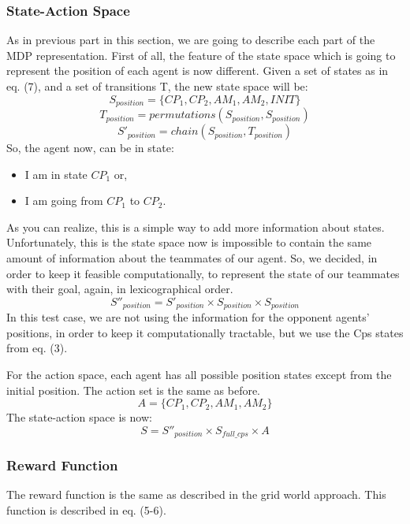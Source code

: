 \documentclass[conference]{IEEEtran}
\begin{document}
\subsubsection{State-Action Space}
As in previous part in this section, we are going to describe each part of the MDP representation. First of all, the feature of the state space which is going to represent the position of each agent is now different. Given a set of states as in eq. (7), and a set of transitions T, the new state space will be:
\begin{equation}
S_{position} = \lbrace CP_1, CP_2, AM_1, AM_2, INIT  \rbrace
\end{equation}
\begin{equation}
T_{position} = permutations(S_{position}, S_{position})
\end{equation}
\begin{equation}
S'_{position} = chain(S_{position}, T_{position})
\end{equation}
So, the agent now, can be in state:
\begin{itemize}
\item I am in state $CP_1$ or,
\item I am going from $CP_1$ to $CP_2$.
\end{itemize}
As you can realize, this is a simple way to add more information about states. Unfortunately, this is the state space now is impossible to contain the same amount of information about the teammates of our agent. So, we decided, in order to keep it feasible computationally, to represent the state of our teammates with their goal, again, in lexicographical order.
\begin{equation}
S''_{position} = S'_{position} \times S_{position} \times S_{position} 
\end{equation}
In this test case, we are not using the information for the opponent agents' positions, in order to keep it computationally tractable, but we use the Cps states from eq. (3).

For the action space, each agent has all possible position states except from the initial position.
The action set is the same as before.
\begin{equation}
A = \lbrace CP_1, CP_2, AM_1, AM_2 \rbrace
\end{equation}
The state-action space is now:
\begin{equation}
S = S''_{position} \times S_{full\_cps} \times A
\end{equation}
\subsubsection{Reward Function}
The reward function is the same as described in the grid world approach. This function is described in eq. (5-6).
\end{document}
